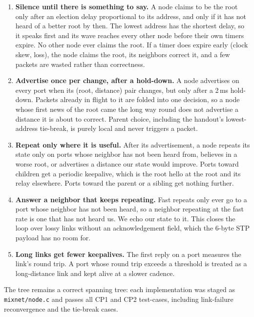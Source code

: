 \documentclass[11pt]{article}
\begin{document}
\begin{enumerate}
\item \textbf{Silence until there is something to say.}
A node claims to be the root only after an election delay proportional to its address, and only if it has not heard of a better root by then.
The lowest address has the shortest delay, so it speaks first and its wave reaches every other node before their own timers expire.
No other node ever claims the root.
If a timer does expire early (clock skew, loss), the node claims the root, its neighbors correct it, and a few packets are wasted rather than correctness.

\item \textbf{Advertise once per change, after a hold-down.}
A node advertises on every port when its (root, distance) pair changes, but only after a 2\,ms hold-down.
Packets already in flight to it are folded into one decision, so a node whose first news of the root came the long way round does not advertise a distance it is about to correct.
Parent choice, including the handout's lowest-address tie-break, is purely local and never triggers a packet.

\item \textbf{Repeat only where it is useful.}
After its advertisement, a node repeats its state only on ports whose neighbor has not been heard from, believes in a worse root, or advertises a distance our state would improve.
Ports toward children get a periodic keepalive, which is the root hello at the root and its relay elsewhere.
Ports toward the parent or a sibling get nothing further.

\item \textbf{Answer a neighbor that keeps repeating.}
Fast repeats only ever go to a port whose neighbor has not been heard, so a neighbor repeating at the fast rate is one that has not heard us.
We echo our state to it.
This closes the loop over lossy links without an acknowledgement field, which the 6-byte STP payload has no room for.

\item \textbf{Long links get fewer keepalives.}
The first reply on a port measures the link's round trip.
A port whose round trip exceeds a threshold is treated as a long-distance link and kept alive at a slower cadence.
\end{enumerate}

The tree remains a correct spanning tree: each implementation was staged as \texttt{mixnet/node.c} and passes all CP1 and CP2 test-cases, including link-failure reconvergence and the tie-break cases.
\end{document}
